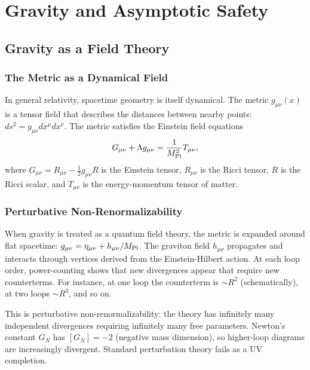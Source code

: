 \documentclass[12pt,a4paper,oneside]{book}
\theoremstyle{definition}
\theoremstyle{plain}
\theoremstyle{remark}
\begin{document}
\part{Gravity and Asymptotic Safety}

\chapter{Gravity as a Field Theory}

\section{The Metric as a Dynamical Field}

In general relativity, spacetime geometry is itself dynamical. The metric
$g_{\mu\nu}(x)$ is a tensor field that describes the distances between
nearby points: $ds^2 = g_{\mu\nu}dx^\mu dx^\nu$. The metric satisfies the
Einstein field equations
\begin{equation}
G_{\mu\nu} + \Lambda g_{\mu\nu} = \frac{1}{M_{\rm Pl}^2}T_{\mu\nu},
\end{equation}
where $G_{\mu\nu} = R_{\mu\nu} - \frac{1}{2}g_{\mu\nu}R$ is the Einstein
tensor, $R_{\mu\nu}$ is the Ricci tensor, $R$ is the Ricci scalar, and
$T_{\mu\nu}$ is the energy-momentum tensor of matter.

\section{Perturbative Non-Renormalizability}

When gravity is treated as a quantum field theory, the metric is expanded
around flat spacetime: $g_{\mu\nu} = \eta_{\mu\nu} + h_{\mu\nu}/M_{\rm Pl}$.
The graviton field $h_{\mu\nu}$ propagates and interacts through vertices
derived from the Einstein-Hilbert action. At each loop order, power-counting
shows that new divergences appear that require new counterterms. For instance,
at one loop the counterterm is $\sim R^2$ (schematically), at two loops
$\sim R^3$, and so on.

This is perturbative non-renormalizability: the theory has infinitely many
independent divergences requiring infinitely many free parameters. Newton's
constant $G_N$ has $[G_N] = -2$ (negative mass dimension), so higher-loop
diagrams are increasingly divergent. Standard perturbation theory fails as
a UV completion.
\end{document}
